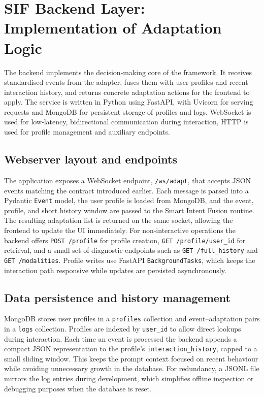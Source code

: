 \documentclass[openany]{book}
\begin{document}
\section{SIF Backend Layer: Implementation of Adaptation Logic}
The backend implements the decision‑making core of the framework. It receives standardised events from the adapter, fuses them with user profiles and recent interaction history, and returns concrete adaptation actions for the frontend to apply. The service is written in Python using FastAPI, with Uvicorn for serving requests and MongoDB for persistent storage of profiles and logs. WebSocket is used for low‑latency, bidirectional communication during interaction, HTTP is used for profile management and auxiliary endpoints.

\subsection{Webserver layout and endpoints}
The application exposes a WebSocket endpoint, \texttt{/ws/adapt}, that accepts JSON events matching the contract introduced earlier. Each message is parsed into a Pydantic \texttt{Event} model, the user profile is loaded from MongoDB, and the event, profile, and short history window are passed to the Smart Intent Fusion routine. The resulting adaptation list is returned on the same socket, allowing the frontend to update the UI immediately. For non‑interactive operations the backend offers \texttt{POST /profile} for profile creation, \texttt{GET /profile/{user\_id}} for retrieval, and a small set of diagnostic endpoints such as \texttt{GET /full\_history} and \texttt{GET /modalities}. Profile writes use FastAPI \texttt{BackgroundTasks}, which keeps the interaction path responsive while updates are persisted asynchronously.

\subsection{Data persistence and history management}
MongoDB stores user profiles in a \texttt{profiles} collection and event–adaptation pairs in a \texttt{logs} collection. Profiles are indexed by \texttt{user\_id} to allow direct lookups during interaction. Each time an event is processed the backend appends a compact JSON representation to the profile’s \texttt{interaction\_history}, capped to a small sliding window. This keeps the prompt context focused on recent behaviour while avoiding unnecessary growth in the database. For redundancy, a JSONL file mirrors the log entries during development, which simplifies offline inspection or debugging purposes when the database is reset.
\end{document}
